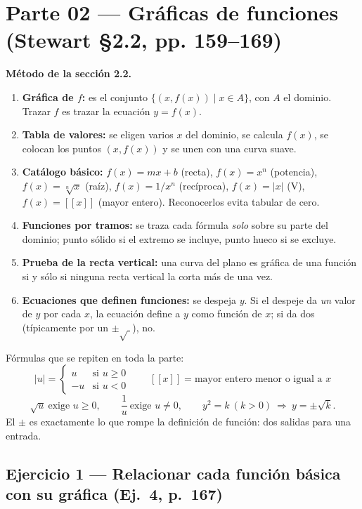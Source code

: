 \documentclass[11pt]{article}
\newcommand{\ment}[1]{[\![#1]\!]}
\begin{document}
\section*{Parte 02 — Gráficas de funciones (Stewart §2.2, pp. 159--169)}

\begin{teo}
\textbf{Método de la sección 2.2.}
\begin{enumerate}[leftmargin=*]
\item \textbf{Gráfica de $f$:} es el conjunto $\{(x,f(x)) \mid x\in A\}$, con $A$ el dominio. Trazar $f$ es trazar la ecuación $y=f(x)$.
\item \textbf{Tabla de valores:} se eligen varios $x$ del dominio, se calcula $f(x)$, se colocan los puntos $(x,f(x))$ y se unen con una curva suave.
\item \textbf{Catálogo básico:} $f(x)=mx+b$ (recta), $f(x)=x^n$ (potencia), $f(x)=\sqrt[n]{x}$ (raíz), $f(x)=1/x^n$ (recíproca), $f(x)=|x|$ (V), $f(x)=\ment{x}$ (mayor entero). Reconocerlos evita tabular de cero.
\item \textbf{Funciones por tramos:} se traza cada fórmula \emph{solo} sobre su parte del dominio; punto sólido si el extremo se incluye, punto hueco si se excluye.
\item \textbf{Prueba de la recta vertical:} una curva del plano es gráfica de una función si y sólo si ninguna recta vertical la corta más de una vez.
\item \textbf{Ecuaciones que definen funciones:} se despeja $y$. Si el despeje da \emph{un} valor de $y$ por cada $x$, la ecuación define a $y$ como función de $x$; si da dos (típicamente por un $\pm\sqrt{\;}$), no.
\end{enumerate}
\end{teo}

\begin{tip}
Fórmulas que se repiten en toda la parte:
\[
|u|=\begin{cases}u & \text{si } u\ge 0\\ -u & \text{si } u<0\end{cases}
\qquad
\ment{x}=\text{mayor entero menor o igual a } x
\]
\[
\sqrt{u}\ \text{exige } u\ge 0,
\qquad
\frac{1}{u}\ \text{exige } u\ne 0,
\qquad
y^2=k\ (k>0)\ \Longrightarrow\ y=\pm\sqrt{k}.
\]
El $\pm$ es exactamente lo que rompe la definición de función: dos salidas para una entrada.
\end{tip}

\subsection*{Ejercicio 1 — Relacionar cada función básica con su gráfica (Ej.~4, p.~167)}
\end{document}
